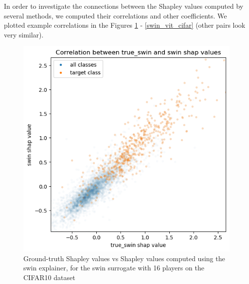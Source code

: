 \documentclass[magisterska,en]{pracamgr}
\begin{document}
In order to investigate the connections between the Shapley values computed by several methods, we computed their correlations and other coefficients. We plotted example correlations in the Figures \ref{true_swin_swin_cifar} - \ref{swin_vit_cifar} (other pairs look very similar).



\begin{figure}[H]
\centering
\includegraphics[scale=0.5]{./images/true_swin_swin_cifar.png}
\caption{Ground-truth Shapley values vs Shapley values computed using the swin explainer, for the swin surrogate with 16 players on the CIFAR10 dataset}
\label{true_swin_swin_cifar}
\end{figure}
\end{document}
